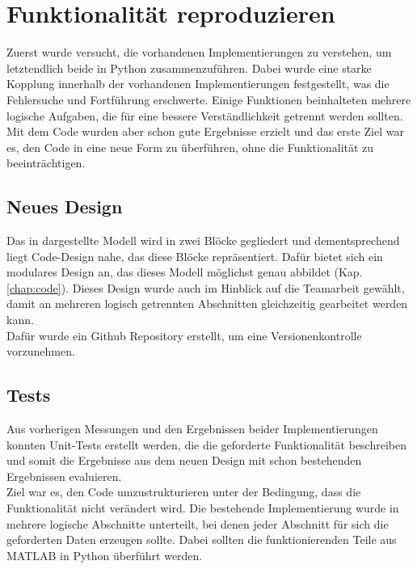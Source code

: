\documentclass[../Report.tex]{subfiles}
\begin{document}
\section[Funktionalität reproduzieren]{Funktionalität reproduzieren}
\label{sec:vorg.reproduktion}
Zuerst wurde versucht, die vorhandenen Implementierungen zu verstehen, um letztendlich beide in Python zusammenzuführen. Dabei wurde eine starke Kopplung innerhalb der vorhandenen Implementierungen festgestellt, was die Fehlersuche und Fortführung erschwerte. Einige Funktionen beinhalteten mehrere logische Aufgaben, die für eine bessere Verständlichkeit getrennt werden sollten. Mit dem Code wurden aber schon gute Ergebnisse erzielt und das erste Ziel war es, den Code in eine neue Form zu überführen, ohne die Funktionalität zu beeinträchtigen.
\subsection*{Neues Design}
\label{sec:vorg.design}
Das in  dargestellte Modell wird in zwei Blöcke gegliedert und dementsprechend liegt Code-Design nahe, das diese Blöcke repräsentiert. Dafür bietet sich ein modulares Design an, das dieses Modell möglichst genau abbildet (Kap. \ref{chap:code}). Dieses Design wurde auch im Hinblick auf die Teamarbeit gewählt, damit an mehreren logisch getrennten Abschnitten gleichzeitig gearbeitet werden kann. \\ Dafür wurde ein Github Repository erstellt, um eine Versionenkontrolle vorzunehmen.
\subsection*{Tests}
\label{sec:vorg.tests}
Aus vorherigen Messungen und den Ergebnissen beider Implementierungen konnten Unit-Tests erstellt werden, die die geforderte Funktionalität beschreiben und somit die Ergebnisse aus dem neuen Design mit schon bestehenden Ergebnissen evaluieren. \\ Ziel war es, den Code umzustrukturieren unter der Bedingung, dass die Funktionalität nicht verändert wird. Die bestehende Implementierung wurde in mehrere logische Abschnitte unterteilt, bei denen jeder Abschnitt für sich die geforderten Daten erzeugen sollte. Dabei sollten die funktionierenden Teile aus MATLAB in Python überführt werden.
\end{document}
